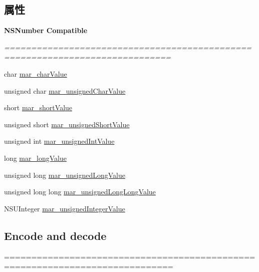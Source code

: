 \subsection*{属性}
\begin{Indent}\textbf{ N\+S\+Number Compatible}\par
{\em ============================================================================= 

 }\begin{DoxyCompactItemize}
\item 
char \hyperlink{category_n_s_string_07_m_a_r_e_x_08_aa059782e115e39da8da025061f9492cb}{mar\+\_\+char\+Value}
\item 
unsigned char \hyperlink{category_n_s_string_07_m_a_r_e_x_08_a8751e2b9dbf76c56f9597057b227e1b0}{mar\+\_\+unsigned\+Char\+Value}
\item 
short \hyperlink{category_n_s_string_07_m_a_r_e_x_08_a77a06144b785616d6ae01f2a80f5ecce}{mar\+\_\+short\+Value}
\item 
unsigned short \hyperlink{category_n_s_string_07_m_a_r_e_x_08_a287066af0138b96bc88936fc362de37f}{mar\+\_\+unsigned\+Short\+Value}
\item 
unsigned int \hyperlink{category_n_s_string_07_m_a_r_e_x_08_a5fb2549e64b3732547a1ce8166849705}{mar\+\_\+unsigned\+Int\+Value}
\item 
long \hyperlink{category_n_s_string_07_m_a_r_e_x_08_adfa1aa56254c6b0873ebfd5c395f1710}{mar\+\_\+long\+Value}
\item 
unsigned long \hyperlink{category_n_s_string_07_m_a_r_e_x_08_ad3f0fe971b5d1b714e3573968c3ecf25}{mar\+\_\+unsigned\+Long\+Value}
\item 
unsigned long long \hyperlink{category_n_s_string_07_m_a_r_e_x_08_a0ba30f3ebd4a775477eaf8476601e7ea}{mar\+\_\+unsigned\+Long\+Long\+Value}
\item 
N\+S\+U\+Integer \hyperlink{category_n_s_string_07_m_a_r_e_x_08_a6c469f9948cd1ea2da640830db1f8ca5}{mar\+\_\+unsigned\+Integer\+Value}
\end{DoxyCompactItemize}
\end{Indent}
\subsection*{Encode and decode}
\label{_amgrp564394bc5aa2aafec283d1d4c37dc238}%
============================================================================= 

